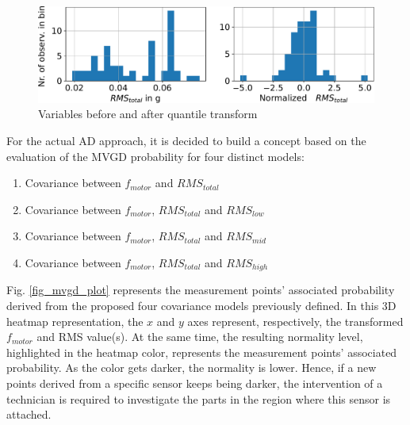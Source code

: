 \documentclass[conference]{IEEEtran}
\begin{document}

\begin{figure}[htbp]
\centerline{\includegraphics[width=\columnwidth]{graphics/quantile_transform_data/quantile_transform_data_ohne.pdf}}
\caption{Variables before and after quantile transform}
\label{fig_transform_result}
\end{figure}

For the actual AD approach, it is decided to build a concept based on the evaluation of the MVGD probability for four distinct models:

\begin{enumerate}
	\item Covariance between $f_{motor}$ and $RMS_{total}$
	\item Covariance between $f_{motor}$, $RMS_{total}$ and $RMS_{low}$
	\item Covariance between $f_{motor}$, $RMS_{total}$ and $RMS_{mid}$
	\item Covariance between $f_{motor}$, $RMS_{total}$ and $RMS_{high}$
\end{enumerate}


Fig. \ref{fig_mvgd_plot} represents the measurement points' associated probability derived from the proposed four covariance models previously defined. In this 3D heatmap representation, the $x$ and $y$ axes represent, respectively, the transformed $f_{motor}$ and RMS value(s). At the same time, the resulting normality level, highlighted in the heatmap color, represents the measurement points' associated probability. As the color gets darker, the normality is lower. Hence, if a new points  derived from a specific sensor keeps being darker, the intervention of a technician is required to investigate the parts in the region where this sensor is attached. 

\end{document}
